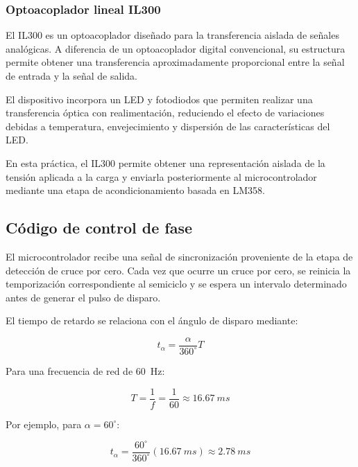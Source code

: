 \documentclass[12pt]{article}
\begin{document}
\subsubsection{Optoacoplador lineal IL300}

El IL300 es un optoacoplador diseñado para la transferencia aislada de
señales analógicas. A diferencia de un optoacoplador digital convencional,
su estructura permite obtener una transferencia aproximadamente proporcional
entre la señal de entrada y la señal de salida.

El dispositivo incorpora un LED y fotodiodos que permiten realizar una
transferencia óptica con realimentación, reduciendo el efecto de variaciones
debidas a temperatura, envejecimiento y dispersión de las características
del LED.

En esta práctica, el IL300 permite obtener una representación aislada de la
tensión aplicada a la carga y enviarla posteriormente al microcontrolador
mediante una etapa de acondicionamiento basada en LM358.

\subsection{Código de control de fase}

El microcontrolador recibe una señal de sincronización proveniente de la
etapa de detección de cruce por cero. Cada vez que ocurre un cruce por cero,
se reinicia la temporización correspondiente al semiciclo y se espera un
intervalo determinado antes de generar el pulso de disparo.

El tiempo de retardo se relaciona con el ángulo de disparo mediante:

\begin{equation}
t_{\alpha} =
\frac{\alpha}{360^\circ}T
\label{eq:retardo}
\end{equation}

Para una frecuencia de red de \SI{60}{Hz}:

\begin{equation}
T=\frac{1}{f}
=\frac{1}{60}
\approx\SI{16.67}{ms}
\label{eq:periodo}
\end{equation}

Por ejemplo, para $\alpha=60^\circ$:

\begin{equation}
t_{\alpha}
=
\frac{60^\circ}{360^\circ}
\left(\SI{16.67}{ms}\right)
\approx\SI{2.78}{ms}
\label{eq:retardo60}
\end{equation}
\end{document}
